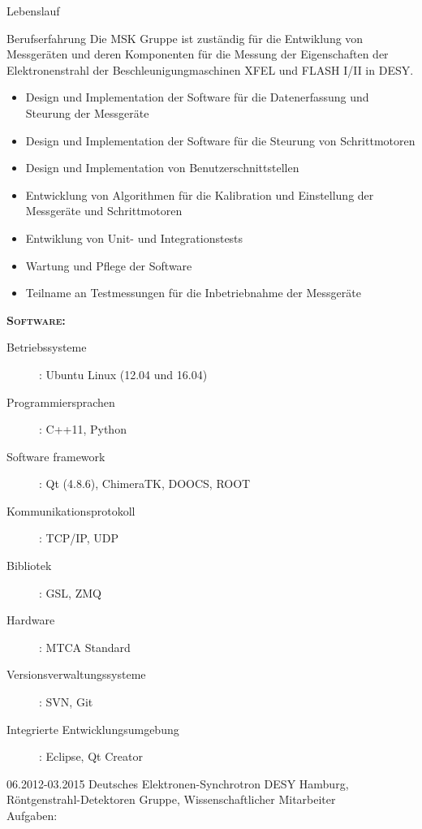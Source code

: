 \documentclass[11pt,a4paper]{scrartcl}
\begin{document}
\begin{cv}{Lebenslauf}
\begin{cvlist}{Berufserfahrung}
Die MSK Gruppe ist zust{\"a}ndig f{\"u}r die Entwiklung von Messger{\"a}ten und
deren Komponenten f{\"u}r die Messung der Eigenschaften der Elektronenstrahl der
Beschleunigungmaschinen XFEL und FLASH I/II in DESY.
\begin{itemize}
  \item Design und Implementation der Software f{\"u}r die Datenerfassung und
  Steurung der Messger{\"a}te
  \item Design und Implementation der Software f{\"u}r die Steurung von
  Schrittmotoren
  \item Design und Implementation von Benutzerschnittstellen
  \item Entwicklung von Algorithmen f{\"u}r die Kalibration und
  Einstellung der Messger{\"a}te und Schrittmotoren
  \item Entwiklung von Unit- und Integrationstests
  \item Wartung und Pflege der Software
  \item Teilname an Testmessungen f{\"u}r die Inbetriebnahme der Messger{\"a}te
\end{itemize}
{\scshape {\bfseries Software:}}
\begin{description}
\item[Betriebssysteme] : Ubuntu Linux (12.04 und 16.04)
\item[Programmiersprachen] : C++11, Python
\item[Software framework] : Qt (4.8.6), ChimeraTK, DOOCS, ROOT
\item[Kommunikationsprotokoll] : TCP/IP, UDP
\item[Bibliotek] : GSL, ZMQ
\item[Hardware] : MTCA Standard
\item[Versionsverwaltungssysteme] : SVN, Git
\item[Integrierte Entwicklungsumgebung] : Eclipse, Qt Creator
\end{description}


\item[06.2012-03.2015] Deutsches Elektronen-Synchrotron DESY Hamburg,
R{\"o}ntgenstrahl-Detektoren Gruppe, Wissenschaftlicher Mitarbeiter\\

Aufgaben:\\


\end{cvlist}
\end{cv}
\end{document}
